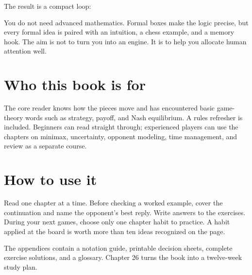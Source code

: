 The result is a compact loop:

\begin{center}
\end{center}

You do not need advanced mathematics. Formal boxes make the logic precise, but every formal idea is paired with an intuition, a chess example, and a memory hook. The aim is not to turn you into an engine. It is to help you allocate human attention well.

\section*{Who this book is for}
The core reader knows how the pieces move and has encountered basic game-theory words such as strategy, payoff, and Nash equilibrium. A rules refresher is included. Beginners can read straight through; experienced players can use the chapters on minimax, uncertainty, opponent modeling, time management, and review as a separate course.

\section*{How to use it}
Read one chapter at a time. Before checking a worked example, cover the continuation and name the opponent's best reply. Write answers to the exercises. During your next games, choose only one chapter habit to practice. A habit applied at the board is worth more than ten ideas recognized on the page.

The appendices contain a notation guide, printable decision sheets, complete exercise solutions, and a glossary. Chapter 26 turns the book into a twelve-week study plan.


